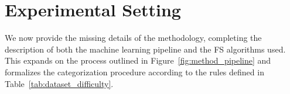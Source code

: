 \documentclass[preprint,12pt,authoryear]{elsarticle}
\begin{document}



\section{Experimental Setting}\label{sec:exp_setting}

We now provide the missing details of the methodology, completing the description of both the machine learning pipeline and the FS algorithms used. This expands on the process outlined in Figure~\ref{fig:method_pipeline} and formalizes the categorization procedure according to the rules defined in Table~\ref{tab:dataset_difficulty}.
\end{document}
